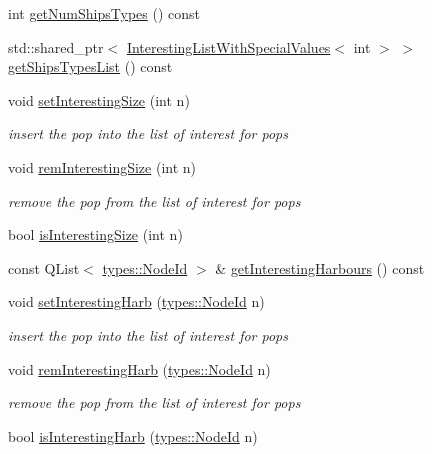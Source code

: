 \begin{DoxyCompactItemize}
int \mbox{\hyperlink{class_displace_model_acaea7cc6acece7227261f227ebcc3849}{get\+Num\+Ships\+Types}} () const
\item 
std\+::shared\+\_\+ptr$<$ \mbox{\hyperlink{class_interesting_list_with_special_values}{Interesting\+List\+With\+Special\+Values}}$<$ int $>$ $>$ \mbox{\hyperlink{class_displace_model_ab0ebc154e08b897edf68c3469319e977}{get\+Ships\+Types\+List}} () const
\item 
void \mbox{\hyperlink{class_displace_model_a0e1e1d7d375f32a8d7727b7640df1636}{set\+Interesting\+Size}} (int n)
\begin{DoxyCompactList}\small\item\em insert the pop into the list of interest for pops \end{DoxyCompactList}\item 
void \mbox{\hyperlink{class_displace_model_acf4a0bf8faf1310309e0223bd165c6b1}{rem\+Interesting\+Size}} (int n)
\begin{DoxyCompactList}\small\item\em remove the pop from the list of interest for pops \end{DoxyCompactList}\item 
bool \mbox{\hyperlink{class_displace_model_a695f2dcb2eecf5503031c96dbc440af1}{is\+Interesting\+Size}} (int n)
\item 
const Q\+List$<$ \mbox{\hyperlink{classtypes_1_1_node_id}{types\+::\+Node\+Id}} $>$ \& \mbox{\hyperlink{class_displace_model_a3d108984b71a1e1371861a042c8944e4}{get\+Interesting\+Harbours}} () const
\item 
void \mbox{\hyperlink{class_displace_model_a7044ecac8dd243ba39aef3924ba89fb9}{set\+Interesting\+Harb}} (\mbox{\hyperlink{classtypes_1_1_node_id}{types\+::\+Node\+Id}} n)
\begin{DoxyCompactList}\small\item\em insert the pop into the list of interest for pops \end{DoxyCompactList}\item 
void \mbox{\hyperlink{class_displace_model_a5b9636d19ddbafde6bc8658e3872d9f5}{rem\+Interesting\+Harb}} (\mbox{\hyperlink{classtypes_1_1_node_id}{types\+::\+Node\+Id}} n)
\begin{DoxyCompactList}\small\item\em remove the pop from the list of interest for pops \end{DoxyCompactList}\item 
bool \mbox{\hyperlink{class_displace_model_a1c56912d9ba8ffdd9c475df866c1fcf3}{is\+Interesting\+Harb}} (\mbox{\hyperlink{classtypes_1_1_node_id}{types\+::\+Node\+Id}} n)

\end{DoxyCompactItemize}
